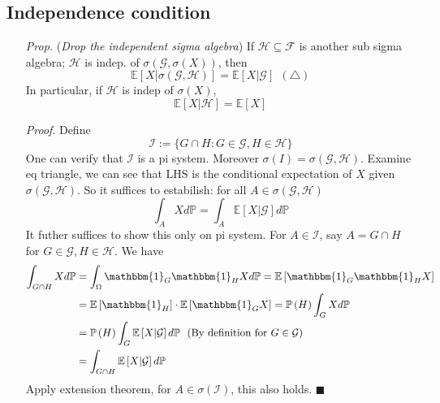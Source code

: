 \documentclass[a4paper,12pt,twoside]{book}
\begin{document}
\subsection{Independence condition}
\begin{itemize}
	\item[\textit{Prop.}] (\textit{Drop the independent sigma algebra}) If $\mathcal{H} \subseteq \mathcal{F}$ is another sub sigma algebra; $\mathcal{H}$ is indep. of $\sigma(\mathcal{G}, \sigma(X))$, then
	\begin{equation}
		\mathbb{E}\left[X|\sigma(\mathcal{G}, \mathcal{H})\right]= \mathbb{E}\left[X|\mathcal{G}\right]~~(\triangle)
	\end{equation}
	In particular, if $\mathcal{H}$ is indep of $\sigma(X)$,
	\begin{equation}
		\mathbb{E}\left[X|\mathcal{H}\right]=\mathbb{E}\left[X\right]
	\end{equation}

	\item[\textit{Proof}.] Define
	\begin{equation}
		\mathcal{I}:=\{G\cap H: G\in \mathcal{G}, H\in \mathcal{H}\}
	\end{equation}
	One can verify that $\mathcal{I}$ is a pi system. Moreover $\sigma(I)=\sigma(\mathcal{G},\mathcal{H})$. Examine eq triangle, we can see that LHS is the conditional expectation of $X$ given $\sigma(\mathcal{G}, \mathcal{H})$. So it suffices to estabilish: for all $A\in \sigma(\mathcal{G},\mathcal{H})$
	\begin{equation}
		\int_A X d\mathbb{P} = \int_A \mathbb{E}\left[X|\mathcal{G}\right] d\mathbb{P}
	\end{equation}
	It futher suffices to show this only on pi system. For $A \in \mathcal{I}$, say $A=G\cap H$ for $G\in \mathcal{G}, H\in \mathcal{H}$. We have
	\begin{equation}
		\begin{split}
			\int_{G \cap H} X d\mathbb{P} &= \int_{\Omega} \mathbbm{1}_{G} \mathbbm{1}_{H} X d\mathbb{P} = \mathbb{E}\left[\mathbbm{1}_{G}\mathbbm{1}_{H}X\right]\\
			&= \mathbb{E}\left[\mathbbm{1}_{H}\right]\cdot \mathbb{E}\left[\mathbbm{1}_{G}X\right]=\mathbb{P}\left(H\right)\int_G X d\mathbb{P} \\
			&= \mathbb{P}\left(H\right) \int_G \mathbb{E}\left[X|\mathcal{G}\right] d\mathbb{P}~~\text{(By definition for $G\in \mathcal{G})$}\\
			&= \int_{G \cap H} \mathbb{E}\left[X|\mathcal{G}\right] d\mathbb{P}
		\end{split}
	\end{equation}
	Apply extension theorem, for $A \in \sigma(\mathcal{I})$, this also holds. $\blacksquare$



\end{itemize}
\end{document}
